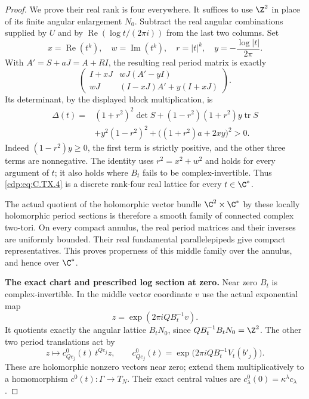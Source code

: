 \begin{proof}
We prove their real rank is four everywhere.
It suffices to use $\Z^2$ in place of its finite
angular enlargement $N_0$. Subtract the real
angular combinations supplied by $U$ and by
$\operatorname{Re}(\log t/(2\pi i))$ from the
last two columns. Set
\[
 x=\operatorname{Re}(t^k),\quad
 w=\operatorname{Im}(t^k),\quad
 r=|t|^k,\quad
 y=-\frac{\log|t|}{2\pi}.
\tag{C.TX.5}\label{cdp:eq:C.TX.5}
\]
With $A'=S+aJ=A+RI$, the resulting real
period matrix is exactly
\[
 \begin{pmatrix}
 I+xJ & wJ(A'-yI)\\
 wJ   & (I-xJ)A'+y(I+xJ)
 \end{pmatrix}.
\tag{C.TX.6}\label{cdp:eq:C.TX.6}
\]
Its determinant, by the displayed block
multiplication, is
\[
 \begin{aligned}
 \Delta(t)={}&(1+r^2)^2\det S
       +(1-r^2)(1+r^2)y\operatorname{tr}S\\
       &+y^2(1-r^2)^2
       +\bigl((1+r^2)a+2xy\bigr)^2>0.
 \end{aligned}
\tag{C.TX.7}\label{cdp:eq:C.TX.7}
\]
Indeed $(1-r^2)y\ge0$, the first term is
strictly positive, and the other three
terms are nonnegative. The identity uses
$r^2=x^2+w^2$ and holds for every argument
of $t$; it also holds where $B_t$ fails
to be complex-invertible. Thus \eqref{cdp:eq:C.TX.4}
is a discrete rank-four real lattice
for every $t\in\C^*$.

The actual quotient of the holomorphic
vector bundle $\C^2\times\C^*$ by these
locally holomorphic period sections is
therefore a smooth family of connected
complex two-tori. On every compact
annulus, the real period matrices and
their inverses are uniformly bounded.
Their real fundamental parallelepipeds
give compact representatives. This
proves properness of this middle family
over the annulus, and hence over $\C^*$.

\par\medskip\noindent\textbf{The exact chart and prescribed log section at zero.}
Near zero $B_t$ is complex-invertible.
In the middle vector coordinate $v$ use
the actual exponential map
\[
                   z=\exp(2\pi iQ B_t^{-1}v).
\tag{C.TX.8}\label{cdp:eq:C.TX.8}
\]
It quotients exactly the angular lattice
$B_tN_0$, since $QB_t^{-1}B_tN_0=\Z^2$.
The other two period translations act by
\[
 z\longmapsto c^0_{Qe_j}(t)\,t^{Qe_j}z,
 \qquad
 c^0_{Qe_j}(t)=
       \exp\bigl(2\pi iQ B_t^{-1}V_t(b'_j)\bigr).
\tag{C.TX.9}\label{cdp:eq:C.TX.9}
\]
These are holomorphic nonzero vectors
near zero; extend them multiplicatively
to a homomorphism $c^0(t):\Gamma\to T_N$.
Their exact central values are
$c^0_\lambda(0)=\kappa^\lambda c_\lambda$.


\end{proof}
